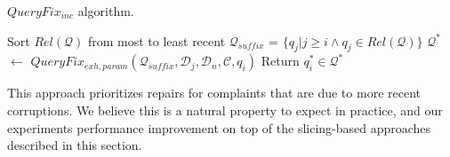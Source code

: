 \begin{algorithm}[htbp]
\caption{$QueryFix_{inc}$ algorithm.}
\label{alg:incalg}
\begin{algorithmic}[2]
\STATE Sort $Rel\mathcal{(Q)}$ from most to least recent
  \STATE $\mathcal{Q}_{suffix}$ = $\{q_j | j \ge i \wedge q_j \in Rel\mathcal{(Q)}\}$
  \STATE $\mathcal{Q}^*$ $\leftarrow$ $QueryFix_{exh,param}(\mathcal{Q}_{suffix}, \mathcal{D}_j, \mathcal{D}_n, \mathcal{C}, q_i)$
    \STATE Return $q_i^* \in \mathcal{Q}^*$
  \ENDIF
\ENDFOR
\end{algorithmic}
\end{algorithm}



This approach prioritizes repairs for complaints that are due to more recent corruptions.
We believe this is a natural property to expect in practice, and our experiments 
performance improvement on top of the slicing-based approaches described in this section.

